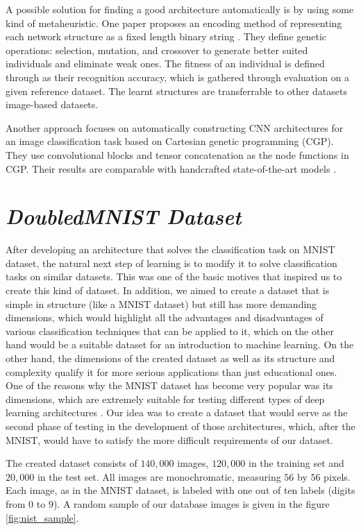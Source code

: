 \documentclass[eng]{simposium}
\begin{document}
A possible solution for finding a good architecture automatically is by using some kind of metaheuristic.  
One paper proposes an encoding method of representing each network structure as a fixed length binary string \cite{4}.  
They define genetic operations: selection, mutation, and crossover to generate better suited individuals and eliminate weak ones. 
The fitness of an individual is defined through as their recognition accuracy, which is gathered through evaluation on a given reference dataset. 
The learnt structures are transferrable to other datasets image-based datasets. 

Another approach focuses on automatically constructing CNN architectures for an image classification task based on Cartesian genetic programming (CGP). 
They use convolutional blocks and tensor concatenation as the node functions in CGP. Their results are comparable with handcrafted state-of-the-art models \cite{5}. 

\section{\textit{DoubledMNIST Dataset}} 

After developing an architecture that solves the classification task on MNIST dataset, the natural next step of learning is  
to modify it to solve classification tasks on similar datasets.  
This was one of the basic motives that inspired us to create this kind of dataset.  
In addition, we aimed to create a dataset that is simple in structure (like a MNIST dataset) but still has more demanding  
dimensions, which would highlight all the advantages and disadvantages of various classification techniques that can be  
applied to it, which on the other hand would be a suitable dataset for an introduction to machine learning.  
On the other hand, the dimensions of the created dataset as well as its structure and complexity qualify it for more  
serious applications than just educational ones.  
One of the reasons why the MNIST dataset has become very popular was its dimensions, which are extremely suitable for  
testing different types of deep learning architectures \cite{27}.  
Our idea was to create a dataset that would serve as the second phase of testing in the development of those architectures,  
which, after the MNIST, would have to satisfy the more difficult requirements of our dataset.  

The created dataset consists of $140,000$ images, $120,000$ in the training set and $20,000$ in the test set.  
All images are monochromatic, measuring $56$ by $56$ pixels.  
Each image, as in the MNIST dataset, is labeled with one out of ten labels (digits from $0$ to $9$).  
A random sample of our database images is given in the figure \ref{fig:nist_sample}.  
\end{document}
